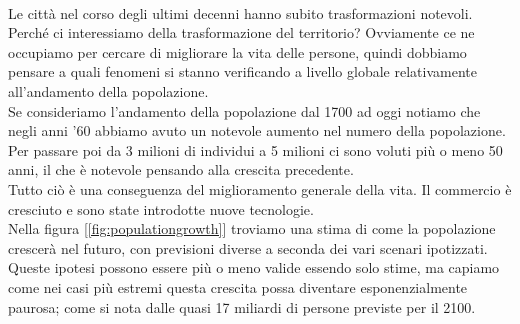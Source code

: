 \documentclass[a4paper,12pt, oneside]{book}
\begin{document}
    \leavevmode\\
    Le città nel corso degli ultimi decenni hanno subito trasformazioni notevoli.\\
    Perché ci interessiamo della trasformazione del territorio? Ovviamente ce ne occupiamo per cercare di migliorare la vita delle persone, quindi dobbiamo pensare a quali fenomeni si stanno verificando a livello globale relativamente all'andamento della popolazione.\\
    Se consideriamo l'andamento della popolazione dal 1700 ad oggi notiamo che negli anni '60 abbiamo avuto un notevole aumento nel numero della popolazione. Per passare poi da 3 milioni di individui a 5 milioni ci sono voluti più o meno 50 anni, il che è notevole pensando alla crescita precedente.\\
    Tutto ciò è una conseguenza del miglioramento generale della vita. Il commercio è cresciuto e sono state introdotte nuove tecnologie.\\
    Nella figura [\ref{fig:populationgrowth}] troviamo una stima di come la popolazione crescerà nel futuro, con previsioni diverse a seconda dei vari scenari ipotizzati. Queste ipotesi possono essere più o meno valide essendo solo stime, ma capiamo come nei casi più estremi questa crescita possa diventare esponenzialmente paurosa; come si nota dalle quasi 17 miliardi di persone previste per il 2100.
    \leavevmode\\
\end{document}
